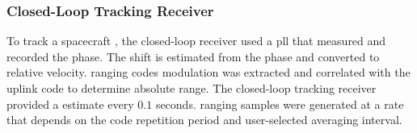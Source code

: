 \documentclass{article}
\begin{document}
            \subsubsection{%
                \footnotesize{Closed-Loop Tracking Receiver}
            }
                \label{subsubsec:usr_closed_loop_track_rec}
                To track a spacecraft
                , the
                \gls{closed-loop} receiver used a \gls{pll}
                that measured and recorded the
                 \gls{phase}.
                The  shift
                is estimated from the phase and converted to
                relative velocity. \Glspl{ranging code}
                \gls{modulation} was extracted and correlated
                with the \gls{uplink} code to determine
                \gls{absolute range}. The \gls{closed-loop}
                tracking receiver provided a
                 estimate
                every $0.1$ seconds. \Glspl{ranging sample}
                were generated at a rate that depends on the
                code repetition period and user-selected
                averaging interval.
\end{document}
